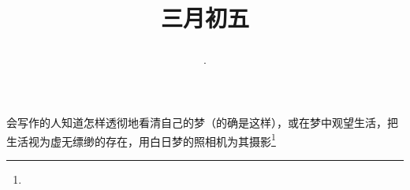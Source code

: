 \title{\date[d=13,m=4,y=2024][year:cn-y,年,month:cn,day:cn,日,·,weekday]·三月初五 }
会写作的人知道怎样透彻地看清自己的梦（的确是这样），或在梦中观望生活，把生活视为虚无缥缈的存在，用白日梦的照相机为其摄影\footnote{ }

